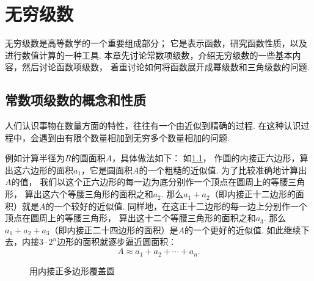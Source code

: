 \begingroup
\def\s{\sum\limits_{i=1}^\infty }
\renewcommand{\s}[1][1]{\sum\limits_{i=#1}^\infty}%
\def\sn{\sum\limits_{i=1}^n}
\def\l{\lim\limits_{n\to\infty}}
\def\tint{\int_{-\pi}^{\pi}}

\chapter{无穷级数}
无穷级数是高等数学的一个重要组成部分；
它是表示函数，研究函数性质，以及进行数值计算的一种工具.
本章先讨论常数项级数，介绍无穷级数的一些基本内容，然后讨论函数项级数，
着重讨论如何将函数展开成幂级数和三角级数的问题.

\section{常数项级数的概念和性质}
人们认识事物在数量方面的特性，往往有一个由近似到精确的过程.
在这种认识过程中，会遇到由有限个数量相加到无穷多个数量相加的问题.

例如计算半径为\(R\)的圆面积\(A\)，具体做法如下：
如\cref{figure:无穷级数.用内接正多边形覆盖圆}，
作圆的内接正六边形，算出这六边形的面积\(a_1\)，它是圆面积\(A\)的一个粗糙的近似值.
为了比较准确地计算出\(A\)的值，
我们以这个正六边形的每一边为底分别作一个顶点在圆周上的等腰三角形，
算出这六个等腰三角形的面积之和\(a_2\).
那么\(a_1+a_2\)（即内接正十二边形的面积）就是\(A\)的一个较好的近似值.
同样地，在这正十二边形的每一边上分别作一个顶点在圆周上的等腰三角形，
算出这十二个等腰三角形的面积之和\(a_3\).
那么\(a_1+a_2+a_3\)（即内接正二十四边形的面积）是\(A\)的一个更好的近似值.
如此继续下去，内接\(3\cdot2^n\)边形的面积就逐步逼近圆面积：\[
	A \approx a_1 + a_2 + \dotsb + a_n.
\]

\begin{figure}[h]
	\centering
	\caption{用内接正多边形覆盖圆}
	\label{figure:无穷级数.用内接正多边形覆盖圆}
\end{figure}

